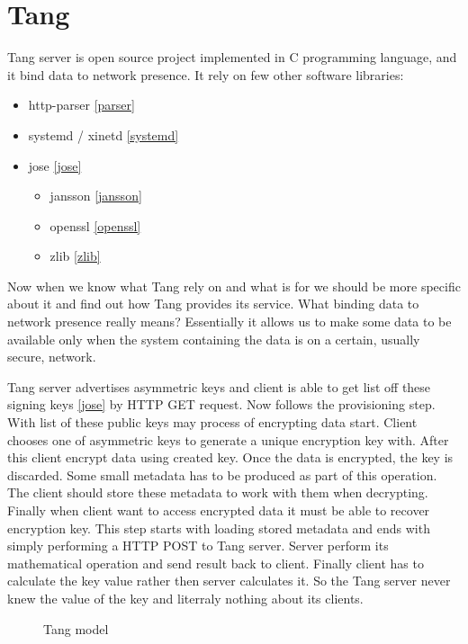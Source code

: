 \documentclass[../xdudla00-porting-Tang-to-Open-WRT.tex]{subfiles}
\begin{document}
\chapter{Tang}\label{tang}
Tang server is open source project implemented in C programming language, and it bind data to network presence.
It rely on few other software libraries:

\begin{itemize}
\item http-parser \ref{parser}
\item systemd / xinetd \ref{systemd}
\item jose \ref{jose}
    \begin{itemize}
    \item jansson \ref{jansson}
    \item openssl \ref{openssl}
    \item zlib \ref{zlib}
    \end{itemize}
\end{itemize}

Now when we know what Tang rely on and what is for we should be more specific about it and find out how Tang provides its service.
What binding data to network presence really means? Essentially it allows us to make some data to be available only when the system containing the data is on a certain, usually secure, network.

Tang server advertises asymmetric keys and client is able to get list off these signing keys \ref{jose} by HTTP GET request.
Now follows the provisioning step. With list of these public keys may process of encrypting data start.
Client chooses one of asymmetric keys to generate a unique encryption key with.
After this client encrypt data using created key. Once the data is encrypted, the key is discarded.
Some small metadata has to be produced as part of this operation. The client should store these metadata to work with them when decrypting.
Finally when client want to access encrypted data it must be able to recover encryption key.
This step starts with loading stored metadata and ends with simply performing a HTTP POST to Tang server.
Server perform its mathematical operation and send result back to client.
Finally client has to calculate the key value rather then server calculates it.
So the Tang server never knew the value of the key and literraly nothing about its clients.

\begin{figure}[h]
    \centering
    \caption{Tang model}
    \label{fig:tangmodel}
\end{figure}
\end{document}
